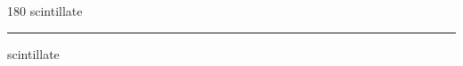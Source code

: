
\begin{frame}
\begin{center}
\begin{turn}{180}
{\fontsize{2.5cm}{1em}\selectfont scintillate}
\end{turn}
\vspace{1em}\par  
\hrule
\vspace{1em}\par  
{\fontsize{2.5cm}{1em}\selectfont scintillate}
\end{center}
\end{frame}
